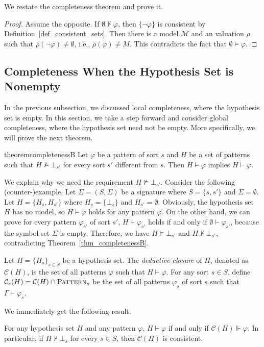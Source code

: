 \documentclass[acmsmall]{acmart}
\theoremstyle{acmdefinition}
\newcommand{\sig}{\mathbb{\Sigma}}
\newcommand{\Pattern}{\textnormal{\textsc{Pattern}}}
\newcommand{\MM}{\mathcal{M}}
\newcommand{\barrho}{\bar{\rho}}
\newcommand{\CC}{\mathcal{C}}
\begin{document}
We restate the completeness theorem and prove it.

\completenessA*

\begin{proof}
Assume the opposite.
If $\emptyset \not\vdash \varphi$, 
then $\{ \neg \varphi \}$ is consistent by 
Definition~\ref{def_consistent_sets}.
Then there is a model $\MM$ and an valuation $\rho$ such that
$\barrho(\neg \varphi) \neq \emptyset$, i.e., 
$\barrho(\varphi) \neq M$.
This contradicts the fact that $\emptyset \vDash \varphi$.
\end{proof}

\subsection{Completeness When the Hypothesis Set is Nonempty}

In the previous subsection, we discussed local completeness,
where the hypothesis set is empty.
In this section, we take a step forward and consider global completeness,
where the hypothesis set need not be empty.
More specifically, we will prove the next theorem.
\begin{restatable}{theorem}{completenessB}
\label{thm_completenessB}
Let $\varphi$ be a pattern of sort $s$ and $H$ 
be a set of patterns
such that $H \not\vDash \bot_{s'}$ for every sort $s'$ different from $s$.  
Then $H \vDash \varphi$ implies $H \vdash \varphi$.
\end{restatable}

We explain why we need the requirement
$H \not\vDash \bot_{s'}$.
Consider the following (counter-)example.
Let $\sig = (S,\Sigma)$ be a signature
where $S = \{s,s'\}$ and $\Sigma = \emptyset$.
Let $H = \{ H_s , H_{s'} \}$ where
$H_s = \{ \bot_s \}$ and $H_{s'} = \emptyset$.
Obviously, the hypothesis set $H$ has no model,
so $H \vDash \varphi$ holds for any pattern $\varphi$.
On the other hand,
we can prove for every pattern $\varphi_{s'}$ of sort $s'$,
$H \vdash \varphi_{s'}$ holds if and only if
$\emptyset \vdash \varphi_{s'}$,
because the symbol set $\Sigma$ is empty.
Therefore, we have
$H \vDash \bot_{s'}$ and $H \not\vdash \bot_{s'}$,
contradicting Theorem~\ref{thm_completenessB}.


\begin{definition}
\label{def_deductive_closure}
Let $H = \{ H_s \}_{s \in S}$ be a hypothesis set.
The \emph{deductive closure} of $H$,
denoted as $\CC(H)$,
is the set of all patterns $\varphi$ such that
$H \vdash \varphi$. 
For any sort $s \in S$,
define $\CC_s(H) = \CC(H) \cap \Pattern_s$
be the set of all patterns $\varphi_s$ of sort $s$ such that
$\Gamma \vdash \varphi_s$.
\end{definition}
We immediately get the following result.
\begin{proposition}
For any hypothesis set $H$ and any pattern $\varphi$, 
$H \vdash \varphi$ if and only if 
$\CC(H) \Vdash \varphi$.
In particular, if $H \not\vdash \bot_s$ for every $s \in S$,
then $\CC(H)$ is consistent.
\end{proposition}
\end{document}
